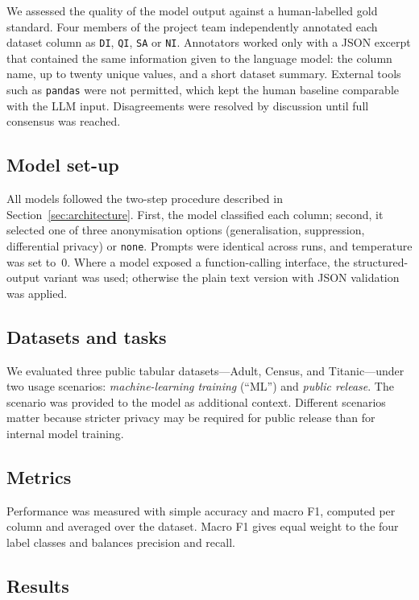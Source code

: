 \documentclass{article}
\begin{document}
We assessed the quality of the model output against a human‐labelled gold standard.  
Four members of the project team independently annotated each dataset column as \texttt{DI}, \texttt{QI}, \texttt{SA} or \texttt{NI}.  
Annotators worked only with a JSON excerpt that contained the same information given to the language model: the column name, up to twenty unique values, and a short dataset summary.  
External tools such as \texttt{pandas} were not permitted, which kept the human baseline comparable with the LLM input.  
Disagreements were resolved by discussion until full consensus was reached.

\subsection{Model set-up}

All models followed the two-step procedure described in Section~\ref{sec:architecture}.  
First, the model classified each column; second, it selected one of three anonymisation options (generalisation, suppression, differential privacy) or \texttt{none}.  
Prompts were identical across runs, and temperature was set to~0.  
Where a model exposed a function-calling interface, the structured-output variant was used; otherwise the plain text version with JSON validation was applied.

\subsection{Datasets and tasks}

We evaluated three public tabular datasets—Adult, Census, and Titanic—under two usage scenarios: \textit{machine-learning training} (“ML”) and \textit{public release}.  
The scenario was provided to the model as additional context.  
Different scenarios matter because stricter privacy may be required for public release than for internal model training.

\subsection{Metrics}

Performance was measured with simple accuracy and macro F1, computed per column and averaged over the dataset.  
Macro F1 gives equal weight to the four label classes and balances precision and recall.

\subsection{Results}
\end{document}
